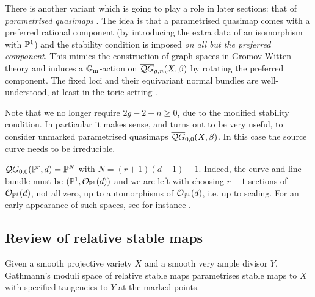 \begin{remark}
There is another variant which is going to play a role in later sections: that of \emph{parametrised quasimaps} \cite[\S 7]{CF-K}. The idea is that a parametrised quasimap comes with a preferred rational component (by introducing the extra data of an isomorphism with $\mathbb P^1$) and the stability condition is imposed \emph{on all but the preferred component}. This mimics the construction of graph spaces in Gromov-Witten theory and induces a $\mathbb{G}_{\text{m}}$-action on $\overline{\mathcal QG}_{g,n}(X,\beta)$ by rotating the preferred component. The fixed loci and their equivariant normal bundles are well-understood, at least in the toric setting \cite[\S 7]{CF-K}.
 
Note that we no longer require $2g-2+n\geq 0$, due to the modified stability condition. In particular it makes sense, and turns out to be very useful, to consider unmarked parametrised quasimaps $\overline{\mathcal QG}_{0,0}(X,\beta)$. In this case the source curve needs to be irreducible. 
\end{remark}

\begin{example} $\overline{\mathcal QG}_{0,0}(\mathbb P^r,d) = \mathbb P^N$ with $N=(r+1)(d+1)-1$. Indeed, the curve and line bundle must be $(\mathbb P^1,\mathcal O_{\mathbb P^1}(d))$ and we are left with choosing $r+1$ sections of $\mathcal O_{\mathbb P^1}(d)$, not all zero, up to automorphisms of $\mathcal O_{\mathbb P^1}(d)$, i.e. up to scaling. For an early appearance of such spaces, see for instance \cite{Bertram}.\end{example}

\subsection{Review of relative stable maps} \label{Subsection relative stable maps} Given a smooth projective variety $X$ and a smooth very ample divisor $Y$, Gathmann's moduli space of relative stable maps parametrises stable maps to $X$ with specified tangencies to $Y$ at the marked points.

